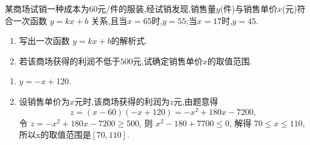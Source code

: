 \documentclass{exam-zh}
\begin{document}
\begin{problem}[points = 10]
某商场试销一种成本为$60$元/件的服装,经试销发现,销售量$y$(件)与销售单价$x$(元)符合一次函数 $y = k x+b$ 关系,且当$x=65$时,$y=55$;当$x = 17$时,$y=45$.
    \begin{enumerate}
        \item 写出一次函数 $y = k x +b $的解析式.
        \item 若该商场获得的利润不低于$500$元,试确定销售单价$x$的取值范围.

    \end{enumerate}
\end{problem}
\begin{solution}
    \begin{enumerate}
        \item $y = -x +120$.
        \item 设销售单价为$x$元时,该商场获得的利润为$z$元,由题意得\[
        z = (x-60) (-x+120) = -x^2 +180x-7200,\]
        令 $z = -x^2 +180x-7200 \ge 500$, 则 $x^2 -180+7700 \le 0$, 解得 $70 \le x\le 110$,
        所以x的取值范围是$[70,110]$.

    
    \end{enumerate}
        
\end{solution}
\end{document}
